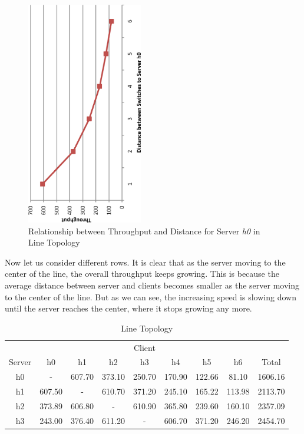 \begin{figure}[ht]
\centering 
	\includegraphics[angle=-90, width=0.45\textwidth, clip]{figs/performance-distance.eps}
	\caption{Relationship between Throughput and Distance for Server {\it h0} in Line Topology}
	\label{fig:perf-dist}
\end{figure}

Now let us consider different rows. It is clear that as the server moving to the center of 
the line, the overall throughput keeps growing. This is because the average distance between
server and clients becomes smaller as the server moving to the center of the line. But as we 
can see, the increasing speed is slowing down until the server reaches the center, where it 
stops growing any more.

\begin{table}
	\renewcommand{\arraystretch}{1.3}
	\caption{Line Topology}
	\label{table:line}
	\setlength\tabcolsep{4pt} %
	\centering
	\begin{tabular}{|c||c|c|c|c|c|c|c||c|}
		\hline
		       & \multicolumn{7}{c||}{Client} &  \\ \hhline{|~||-------||~|}
		Server & h0 & h1 & h2 & h3 & h4 & h5 & h6 & Total\\
\hline\hline
h0 &     -    &  607.70  &  373.10  &  250.70  &  170.90  &  122.66  &  81.10  & 1606.16 \\
\hline
h1 &  607.50  &     -    &  610.70  &  371.20  &  245.10  &  165.22  &  113.98  & 2113.70 \\
\hline
h2 &  373.89  &  606.80  &     -    &  610.90  &  365.80  &  239.60  &  160.10  & 2357.09 \\
\hline
h3 &  243.00  &  376.40  &  611.20  &     -    &  606.70  &  371.20  &  246.20  & 2454.70 \\
\hline
	\end{tabular}
\end{table}


